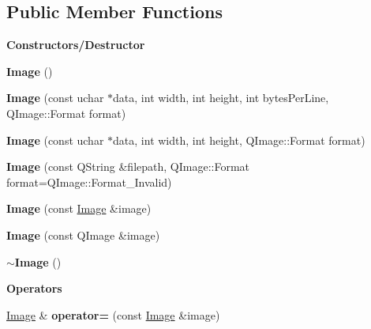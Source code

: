 \subsection*{Public Member Functions}
\begin{Indent}\textbf{ Constructors/\+Destructor}\par
\begin{DoxyCompactItemize}
\item 
\mbox{\label{classrev_1_1_image_a6594cee102cd4e573fc3424a69b440cc}} 
{\bfseries Image} ()
\item 
\mbox{\label{classrev_1_1_image_ae22b1c1eba7acea201926f9dffbb6ad9}} 
{\bfseries Image} (const uchar $\ast$data, int width, int height, int bytes\+Per\+Line, Q\+Image\+::\+Format format)
\item 
\mbox{\label{classrev_1_1_image_a13a49ade53e4afea9fed2c1a51671e30}} 
{\bfseries Image} (const uchar $\ast$data, int width, int height, Q\+Image\+::\+Format format)
\item 
\mbox{\label{classrev_1_1_image_a1e25db3d2c1be3a86ed074db01bbf20c}} 
{\bfseries Image} (const Q\+String \&filepath, Q\+Image\+::\+Format format=Q\+Image\+::\+Format\+\_\+\+Invalid)
\item 
\mbox{\label{classrev_1_1_image_a3de025fb584d43b0f7617dc7581a3be5}} 
{\bfseries Image} (const \mbox{\hyperlink{classrev_1_1_image}{Image}} \&image)
\item 
\mbox{\label{classrev_1_1_image_a98054e452c3a44855ead3578abc47f47}} 
{\bfseries Image} (const Q\+Image \&image)
\item 
\mbox{\label{classrev_1_1_image_a08c43251c1897d30adcd27da8d4373e9}} 
{\bfseries $\sim$\+Image} ()
\end{DoxyCompactItemize}
\end{Indent}
\begin{Indent}\textbf{ Operators}\par
\begin{DoxyCompactItemize}
\item 
\mbox{\label{classrev_1_1_image_aa10f6c2e394107d0c13abb2bbe65b8b8}} 
\mbox{\hyperlink{classrev_1_1_image}{Image}} \& {\bfseries operator=} (const \mbox{\hyperlink{classrev_1_1_image}{Image}} \&image)
\end{DoxyCompactItemize}
\end{Indent}
